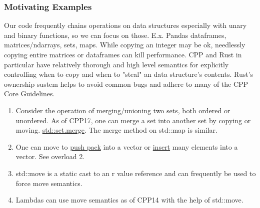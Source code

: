 \documentclass[8pt]{beamer}
\theoremstyle{remark}
\begin{document}
    \begin{frame}
        \frametitle{Motivating Examples}
        Our code frequently chains operations on data structures especially
        with unary and binary functions, so we can focus on those. E.x.
        Pandas dataframes, matrices/ndarrays, sets, maps. While copying an
        integer may be ok, needlessly copying entire matrices or dataframes
        can kill performance. CPP and Rust in particular have relatively
        thorough and high level semantics for explicitly controlling when
        to copy and when to "steal" an data structure's contents. Rust's
        ownership sustem helps to avoid common bugs and adhere to many of
        the CPP Core Guidelines.   
        \begin{enumerate}
            \item Consider the operation of merging/unioning two sets, both
                ordered or unordered. As of CPP17, one can merge a set into
                another set by copying or moving.
                \href{https://en.cppreference.com/w/cpp/container/set/merge.}{std::set.merge}. The
                merge method on std::map is similar.  
            \item One can move to \href{https://en.cppreference.com/w/cpp/container/vector/push_back}{push pack} into a vector
                 or
                 \href{https://en.cppreference.com/w/cpp/container/vector/insert}{insert} many elements into a vector. See
                overload 2.  
            \item std::move is a static cast to an r value reference and can
                frequently be used to force move semantics.
            \item Lambdas can use move semantics as of CPP14 with the help of
                std::move.
        \end{enumerate}
    \end{frame}
\end{document}
